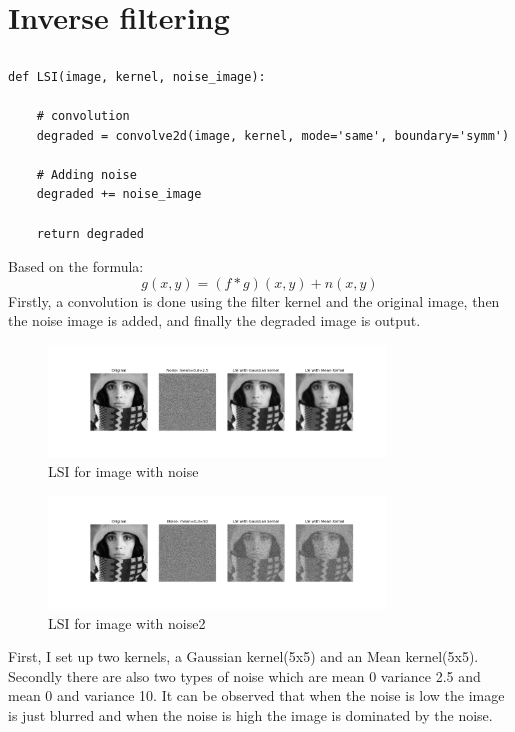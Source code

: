 \documentclass[12pt]{article}
\begin{document}
\section{Inverse filtering}
\subsection{}
\begin{lstlisting}
def LSI(image, kernel, noise_image):

    # convolution
    degraded = convolve2d(image, kernel, mode='same', boundary='symm')
    
    # Adding noise
    degraded += noise_image

    return degraded
\end{lstlisting}
Based on the formula:
\[g(x,y) = (f*g)(x,y)+n(x,y)\]
Firstly, a convolution is done using the filter kernel and the original image, then the noise image is added, and finally the degraded image is output.

\begin{figure}[h]
    \centering
    \includegraphics[width=0.8\textwidth]{pics/a5_2.1_1.png} 
    \caption{LSI for image with noise}
\end{figure}
\begin{figure}[h]
    \centering
    \includegraphics[width=0.8\textwidth]{pics/a5_2.1_2.png} 
    \caption{LSI for image with noise2}
\end{figure}


First, I set up two kernels, a Gaussian kernel(5x5) and an Mean kernel(5x5). Secondly there are also two types of noise which are mean 0 variance 2.5 and mean 0 and variance 10.
It can be observed that when the noise is low the image is just blurred and when the noise is high the image is dominated by the noise.
\end{document}

